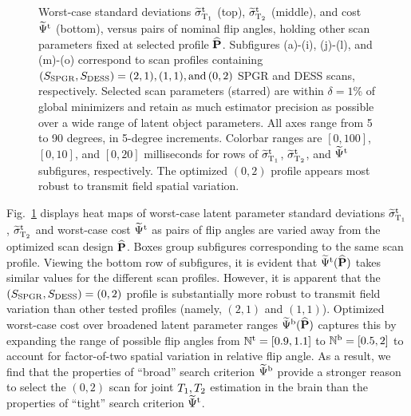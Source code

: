\begin{sidewaysfigure} [!tbp]
{\begin {minipage} [b] [12.5cm] [b] {0.18\textwidth}
		\end{minipage}	
	}
	\caption{
		Worst-case standard deviations $\widetilde{\sigma}_{\mathrm{T}_1}^\mathrm{t}$ (top), $\widetilde{\sigma}_{\mathrm{T}_2}^\mathrm{t}$ (middle), and cost $\widetilde{\Psi}^{\mathrm{t}}$ (bottom), versus pairs of nominal flip angles, holding other scan parameters fixed at selected profile $\widehat{\mathbf{P}}$. 
		Subfigures (a)-(i), (j)-(l), and (m)-(o) correspond to scan profiles containing $(S_{\mathrm{SPGR}}, S_{\mathrm{DESS}}) = (2,1), (1,1), \text{and}\,(0,2)$ SPGR and DESS scans, respectively. 
		Selected scan parameters (starred) are within $\delta = 1$\% of global minimizers and retain as much estimator precision as possible over a wide range of latent object parameters. 		
		All axes range from 5 to 90 degrees, in 5-degree increments. 
		Colorbar ranges are $[0,100]$, $[0,10]$, and $[0,20]$ milliseconds for rows of $\widetilde{\sigma}_{\mathrm{T}_1}^\mathrm{t}$, $\widetilde{\sigma}_{\mathrm{T}_2}^\mathrm{t}$, and $\widetilde{\Psi}^{\mathrm{t}}$ subfigures, respectively. 
		The optimized $(0,2)$ profile appears most robust to transmit field spatial variation.
	}
	\label{fig:scn-dsgn,heat-map}
\end{sidewaysfigure}

Fig.~\ref{fig:scn-dsgn,heat-map} displays heat maps 
of worst-case latent parameter standard deviations 
$\widetilde{\sigma}_{\mathrm{T}_1}^\mathrm{t}$, $\widetilde{\sigma}_{\mathrm{T}_2}^\mathrm{t}$ 
and worst-case cost $\widetilde{\Psi}^{\mathrm{t}}$ 
as pairs of flip angles are varied away 
from the optimized scan design $\widehat{\mathbf{P}}$.
Boxes group subfigures corresponding 
to the same scan profile. 
Viewing the bottom row of subfigures, 
it is evident 
that $\widetilde{\Psi}^{\mathrm{t}}(\widehat{\mathbf{P}})$ takes similar values 
for the different scan profiles. 
However, 
it is apparent that the $(S_{\mathrm{SPGR}},S_{\mathrm{DESS}}) = (0,2)$ profile 
is substantially more robust 
to transmit field variation 
than other tested profiles 
(namely, $(2,1)$ and $(1,1)$). 
Optimized worst-case cost 
over broadened latent parameter ranges 
$\widetilde{\Psi}^{\mathrm{b}}(\widehat{\mathbf{P}})$ captures this 
by expanding the range of possible flip angles 
from $\mathbb{N}^\mathrm{t} = [0.9, 1.1]$ to $\mathbb{N}^\mathrm{b} = [0.5, 2]$ 
to account for factor-of-two spatial variation 
in relative flip angle.
As a result, we find that the properties 
of ``broad'' search criterion $\widetilde{\Psi}^{\mathrm{b}}$ 
provide a stronger reason to select the $(0,2)$ scan 
for joint $T_1, T_2$ estimation in the brain 
than the properties 
of ``tight'' search criterion $\widetilde{\Psi}^{\mathrm{t}}$.

